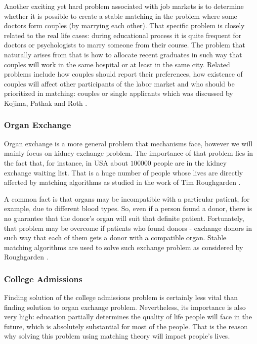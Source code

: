 \documentclass[a4paper]{article} %
\begin{document}
\hfill
\break
Another exciting yet hard problem associated with job markets is to determine whether it is possible to create a stable matching in the problem where some doctors form couples (by marrying each other). That specific problem is closely related to the real life cases: during educational process it is quite frequent for doctors or psychologists to marry someone from their course. The problem that naturally arises from that is how to allocate recent graduates in such way that couples will work in the same hospital or at least in the same city. Related problems include how couples should report their preferences, how existence of couples will affect other participants of the labor market and who should be prioritized in matching: couples or single applicants which was discussed by Kojima, Pathak and Roth \cite{CouplesMatching}.






\subsubsection{Organ Exchange}

Organ exchange is a more general problem that mechanisms face, however we will mainly focus on kidney exchange problem. The importance of that problem lies in the fact that, for instance, in USA about $100000$ people are in the kidney exchange waiting list. That is a huge number of people whose lives are directly affected by matching algorithms as studied in the work of Tim Roughgarden \cite{KidneyExchange}.

\hfill
\break
A common fact is that organs may be incompatible with a particular patient, for example, due to different blood types. So, even if a person found a donor, there is no guarantee that the donor's organ will suit that definite patient. Fortunately, that problem may be overcome if patients who found donors - exchange donors in such way that each of them gets a donor with a compatible organ. Stable matching algorithms are used to solve such exchange problem as considered by Roughgarden \cite{KidneyExchange}.







\subsubsection{College Admissions}

Finding solution of the college admissions problem is certainly less vital than finding solution to organ exchange problem. Nevertheless, its importance is also very high: education partially determines the quality of life people will face in the future, which is absolutely substantial for most of the people. That is the reason why solving this problem using matching theory will impact people's lives.
\end{document}
